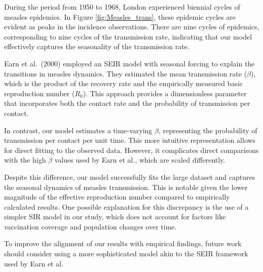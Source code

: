\documentclass[
11pt, %
oneside, %
english, %
singlespacing, %
]{macthesis} %
\begin{document}
During the period from 1950 to 1968, London experienced biennial cycles of measles epidemics. In Figure \ref{fig:Measles_trans}, these epidemic cycles are evident as peaks in the incidence observations. There are nine cycles of epidemics, corresponding to nine cycles of the transmission rate, indicating that our model effectively captures the seasonality of the transmission rate.

Earn et al.~(2000) employed an SEIR model with seasonal forcing to explain the transitions in measles dynamics. They estimated the mean transmission rate (\(\beta\)), which is the product of the recovery rate and the empirically measured basic reproduction number (\(R_0\)). This approach provides a dimensionless parameter that incorporates both the contact rate and the probability of transmission per contact.

In contrast, our model estimates a time-varying \(\beta\), representing the probability of transmission per contact per unit time. This more intuitive representation allows for direct fitting to the observed data. However, it complicates direct comparisons with the high \(\beta\) values used by Earn et al., which are scaled differently.

Despite this difference, our model successfully fits the large dataset and captures the seasonal dynamics of measles transmission. This is notable given the lower magnitude of the effective reproduction number compared to empirically calculated results. One possible explanation for this discrepancy is the use of a simpler SIR model in our study, which does not account for factors like vaccination coverage and population changes over time.

To improve the alignment of our results with empirical findings, future work should consider using a more sophisticated model akin to the SEIR framework used by Earn et al.~
\end{document}
